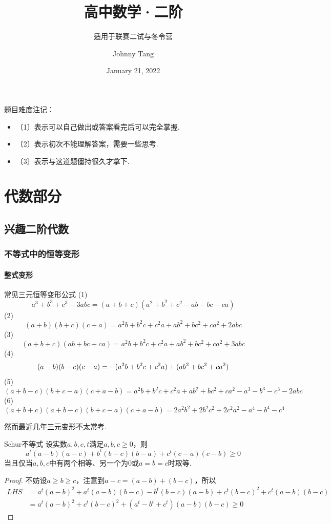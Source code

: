 \documentclass[lang=cn, zihao=4.5]{elegantbook}
\title{高中数学·二阶}
\subtitle{适用于联赛二试与冬令营}
\author{Johnny Tang}
\institute{DEEP Team}
\date{January 21, 2022}
\newcommand{\nd}[1]{〔#1〕}
\begin{document}
\maketitle

\frontmatter

\mainmatter

\tableofcontents

\newpage

题目难度注记：

\begin{itemize}
	\item \nd{1}表示可以自己做出或答案看完后可以完全掌握.
	\item \nd{2}表示初次不能理解答案，需要一些思考.
	\item \nd{3}表示与这道题僵持很久才拿下.
\end{itemize}

\newpage

\part{代数部分}

\chapter{兴趣二阶代数}

\section{不等式中的恒等变形}

\subsection{整式变形}

\begin{proposition}{常见三元恒等变形公式}
	(1)$$a^3+b^3+c^3-3abc = (a+b+c)(a^2+b^2+c^2-ab-bc-ca)$$
	(2)$$(a+b)(b+c)(c+a) = a^2b + b^2c + c^2a + ab^2 + bc^2 + ca^2 +2abc$$
	(3)$$(a+b+c)(ab+bc+ca) = a^2b + b^2c + c^2a + ab^2 + bc^2 + ca^2 +3abc$$
	(4)$$(a-b)(b-c)(c-a) = \color{red}-\color{black}(a^2b+b^2c+c^2a)\color{red}+\color{black}(ab^2+bc^2+ca^2)$$
	(5)$$(a+b-c)(b+c-a)(c+a-b) = a^2b+b^2c+c^2a+ab^2+bc^2+ca^2-a^3-b^3-c^3-2abc$$
	(6)$$(a+b+c)(a+b-c)(b+c-a)(c+a-b) = 2a^2b^2 + 2b^2c^2 + 2c^2a^2 - a^4 -b^4-c^4$$
\end{proposition}

然而最近几年三元变形不太常考.

\begin{theorem}{Schur不等式}
	设实数$a,b,c,t$满足$a,b,c \geq 0$，则$$a^t(a-b)(a-c) + b^t(b-c)(b-a) + c^t(c-a)(c-b) \geq 0$$
	当且仅当$a,b,c$中有两个相等、另一个为$0$或$a=b=c$时取等.
\end{theorem}
\begin{proof}
	不妨设$a \geq b \geq c$，注意到$a-c=(a-b)+(b-c)$，所以
	\begin{align*}
		LHS &= a^t(a-b)^2 + a^t(a-b)(b-c) - b^t(b-c)(a-b) + c^t(b-c)^2 + c^t(a-b)(b-c) \\
		&= a^t(a-b)^2 + c^t(b-c)^2 + (a^t-b^t+c^t)(a-b)(b-c) \geq 0
	\end{align*}
\end{proof}
\end{document}

